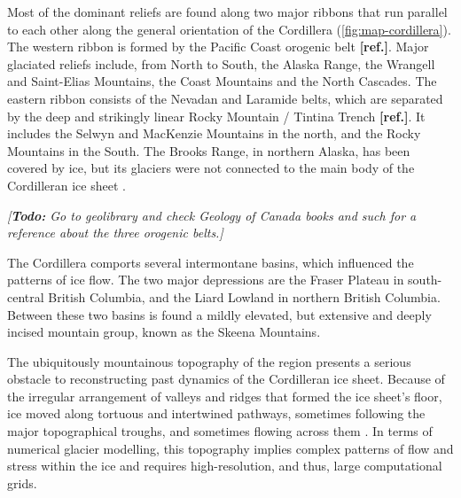 \documentclass{article}
\newcommand{\todo}[1]{\emph{[\textbf{Todo:} #1]}}
\newcommand{\mref}[0]{\textbf{[ref.]}}
\begin{document}
Most of the dominant reliefs are found along two major ribbons that run
parallel to each other along the general orientation of the Cordillera
(\cref{fig:map-cordillera}). The western ribbon is formed by the Pacific Coast
orogenic belt \mref. Major glaciated reliefs include,
from North to South, the Alaska Range, the Wrangell and Saint-Elias Mountains,
the Coast Mountains and the North Cascades. The eastern ribbon consists of the
Nevadan and Laramide belts, which are separated by the deep and strikingly
linear Rocky Mountain / Tintina Trench \mref. It includes the Selwyn and
MacKenzie Mountains in the north, and the Rocky Mountains in the South. The
Brooks Range, in northern Alaska, has been covered by ice, but its glaciers
were not connected to the main body of the Cordilleran ice sheet
\citep{Kaufman.Manley.2004}.

\todo{Go to geolibrary and check \emph{Geology of Canada} books and such for a
      reference about the three orogenic belts.}

The Cordillera comports several intermontane basins, which influenced the
patterns of ice flow. The two major depressions are the Fraser Plateau in
south-central British Columbia, and the Liard Lowland in northern British
Columbia. Between these two basins is found a mildly elevated, but extensive
and deeply incised mountain group, known as the Skeena Mountains.

The ubiquitously mountainous topography of the region presents a serious
obstacle to reconstructing past dynamics of the Cordilleran ice sheet. Because
of the irregular arrangement of valleys and ridges that formed the ice sheet's
floor, ice moved along tortuous and intertwined pathways, sometimes following
the major topographical troughs, and sometimes flowing across them
\citep{Davis.Mathews.1944, Kleman.etal.2010}. In terms of numerical glacier
modelling, this topography implies complex patterns of flow and stress
within the ice and requires high-resolution, and thus, large computational
grids.
\end{document}
